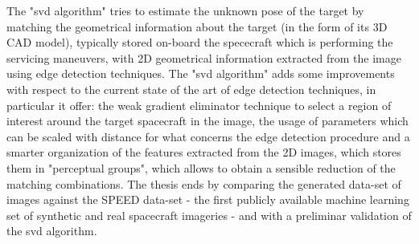 The "\acrshort{svd} algorithm" tries to estimate the unknown pose of the target by matching the geometrical information about the target (in the form of its 3D CAD model), typically stored on-board the spececraft which is performing the servicing maneuvers, with 2D geometrical information extracted from the image using edge detection techniques. The "\acrshort{svd} algorithm" adds some improvements with respect to the current state of the art of edge detection techniques, in particular it offer: the weak gradient eliminator technique to select a region of interest around the target spacecraft in the image, the usage of parameters which can be scaled with distance for what concerns the edge detection procedure and a smarter organization of the features extracted from the 2D images, which stores them in "perceptual groups", which allows to obtain a sensible reduction of the matching combinations. The thesis ends by comparing the generated data-set of images against the SPEED data-set - the first publicly available machine learning set of synthetic and real spacecraft imageries - and with a preliminar validation of the \acrshort{svd} algorithm.